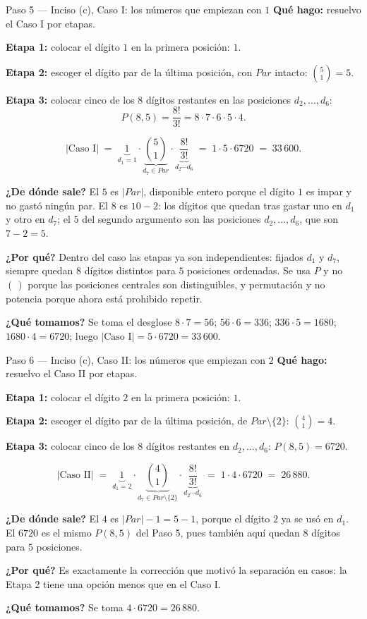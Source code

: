 \documentclass[11pt]{article}
\begin{document}
\begin{paso}{Paso 5 --- Inciso (c), Caso I: los números que empiezan con $1$}
\textbf{Qué hago:} resuelvo el Caso I por etapas.

\medskip
\textbf{Etapa 1:} colocar el dígito $1$ en la primera posición: $1$.

\textbf{Etapa 2:} escoger el dígito par de la última posición, con $Par$ intacto: $\displaystyle\binom{5}{1}=5$.

\textbf{Etapa 3:} colocar cinco de los $8$ dígitos restantes en las posiciones $d_2,\dots,d_6$:
\[
  P(8,5)=\frac{8!}{3!}=8\cdot 7\cdot 6\cdot 5\cdot 4 .
\]

\medskip
\[
  |\text{Caso I}| \;=\; \underbrace{1}_{d_1=1}\cdot \underbrace{\binom{5}{1}}_{d_7\in Par} \cdot \underbrace{\frac{8!}{3!}}_{d_2\cdots d_6} \;=\; 1\cdot 5\cdot 6720 \;=\; 33\,600 .
\]

\textbf{¿De dónde sale?} El $5$ es $|Par|$, disponible entero porque el dígito $1$ es impar y no gastó ningún par. El $8$ es $10-2$: los dígitos que quedan tras gastar uno en $d_1$ y otro en $d_7$; el $5$ del segundo argumento son las posiciones $d_2,\dots,d_6$, que son $7-2=5$.

\textbf{¿Por qué?} Dentro del caso las etapas ya son independientes: fijados $d_1$ y $d_7$, siempre quedan $8$ dígitos distintos para $5$ posiciones ordenadas. Se usa $P$ y no $\binom{}{}$ porque las posiciones centrales son distinguibles, y permutación y no potencia porque ahora está prohibido repetir.

\textbf{¿Qué tomamos?} Se toma el desglose $8\cdot 7=56$; $56\cdot 6=336$; $336\cdot 5=1680$; $1680\cdot 4=6720$; luego $|\text{Caso I}|=5\cdot 6720 = 33\,600$.
\end{paso}

\begin{paso}{Paso 6 --- Inciso (c), Caso II: los números que empiezan con $2$}
\textbf{Qué hago:} resuelvo el Caso II por etapas.

\medskip
\textbf{Etapa 1:} colocar el dígito $2$ en la primera posición: $1$.

\textbf{Etapa 2:} escoger el dígito par de la última posición, de $Par\setminus\{2\}$: $\displaystyle\binom{4}{1}=4$.

\textbf{Etapa 3:} colocar cinco de los $8$ dígitos restantes en $d_2,\dots,d_6$: $P(8,5)=6720$.

\medskip
\[
  |\text{Caso II}| \;=\; \underbrace{1}_{d_1=2}\cdot \underbrace{\binom{4}{1}}_{d_7\in Par\setminus\{2\}} \cdot \underbrace{\frac{8!}{3!}}_{d_2\cdots d_6} \;=\; 1\cdot 4\cdot 6720 \;=\; 26\,880 .
\]

\textbf{¿De dónde sale?} El $4$ es $|Par|-1=5-1$, porque el dígito $2$ ya se usó en $d_1$. El $6720$ es el mismo $P(8,5)$ del Paso 5, pues también aquí quedan $8$ dígitos para $5$ posiciones.

\textbf{¿Por qué?} Es exactamente la corrección que motivó la separación en casos: la Etapa 2 tiene una opción menos que en el Caso I.

\textbf{¿Qué tomamos?} Se toma $4\cdot 6720 = 26\,880$.
\end{paso}
\end{document}
